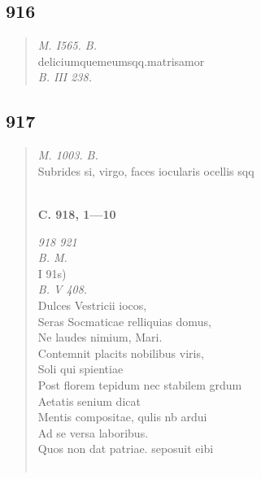 \documentclass[11pt, a4paper]{report}
\begin{document}
            \subsection*{916}
      \begin{verse}
      \textit{M. I565. B.} \\ deliciumquemeumsqq.matrisamor \\ \textit{B. III 238.} \\ 
      \end{verse}
  
            \subsection*{917}
      \begin{verse}
      \textit{M. 1003. B.} \\ Subrides si, virgo, faces iocularis ocellis sqq \\ 
        ﻿\pagebreak 
    \begin{center} \textbf{C. 918, 1—10} \end{center} \marginpar{[344]} \textit{918 921} \\ \textit{B. M.} \\ I 91s) \\ \textit{B. V 408.} \\ Dulces Vestricii iocos, \\ Seras Socmaticae relliquias domus, \\ Ne laudes nimium, Mari. \\ Contemnit placits  \lbrack nobilibus viris, \\ Soli qui spientiae \\ Post florem tepidum nec stabilem grdum \\ Aetatis senium dicat \\ Mentis compositae, qulis nb ardui \\ Ad se versa laboribus. \\ Quos non dat patriae. seposuit eibi \\ 
        ﻿\pagebreak 

\end{verse}
\end{document}
